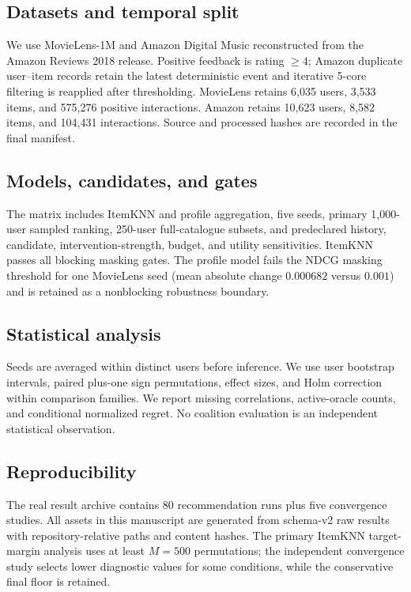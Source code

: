 \documentclass[pdflatex,sn-basic,Numbered]{sn-jnl}
\begin{document}
\subsection{Datasets and temporal split}
We use MovieLens-1M \citep{harper2016,ni2019} and Amazon Digital Music reconstructed from the Amazon Reviews 2018 release. Positive feedback is rating $\ge4$; Amazon duplicate user--item records retain the latest deterministic event and iterative 5-core filtering is reapplied after thresholding. MovieLens retains 6,035 users, 3,533 items, and 575,276 positive interactions. Amazon retains 10,623 users, 8,582 items, and 104,431 interactions. Source and processed hashes are recorded in the final manifest.

\subsection{Models, candidates, and gates}
The matrix includes ItemKNN and profile aggregation, five seeds, primary 1,000-user sampled ranking, 250-user full-catalogue subsets, and predeclared history, candidate, intervention-strength, budget, and utility sensitivities. ItemKNN passes all blocking masking gates. The profile model fails the NDCG masking threshold for one MovieLens seed (mean absolute change $0.000682$ versus $0.001$) and is retained as a nonblocking robustness boundary.

\subsection{Statistical analysis}
Seeds are averaged within distinct users before inference. We use user bootstrap intervals, paired plus-one sign permutations, effect sizes, and Holm correction within comparison families. We report missing correlations, active-oracle counts, and conditional normalized regret. No coalition evaluation is an independent statistical observation.

\subsection{Reproducibility}
The real result archive contains 80 recommendation runs plus five convergence studies. All assets in this manuscript are generated from schema-v2 raw results with repository-relative paths and content hashes. The primary ItemKNN target-margin analysis uses at least $M=500$ permutations; the independent convergence study selects lower diagnostic values for some conditions, while the conservative final floor is retained.
\end{document}
